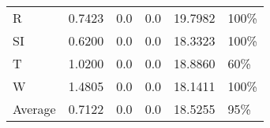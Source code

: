 \documentclass[11pt, a4paper]{article}
\begin{document}
\begin{table}[H]
\begin{tabular}{llllll}
R                                & 0.7423                            & 0.0                               & 0.0                                  & 19.7982                                     & 100\%                             \\
SI                        & 0.6200                            & 0.0                               & 0.0                                  & 18.3323                                     & 100\%                             \\
T                              & 1.0200                            & 0.0                               & 0.0                                  & 18.8860                                     & 60\%                              \\
W                             & 1.4805                            & 0.0                               & 0.0                                  & 18.1411                                     & 100\%                             \\ \hline
Average                               & 0.7122                            & 0.0                               & 0.0                                  & 18.5255                                     & 95\%
\end{tabular}
\end{table}
\end{document}
